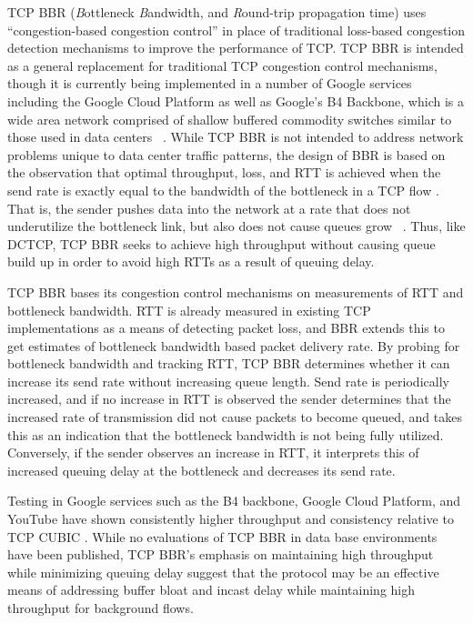 TCP BBR (\emph{B}ottleneck \emph{B}andwidth, and \emph{R}ound-trip propagation time) uses ``congestion-based congestion control'' in place of traditional loss-based congestion detection mechanisms to improve the performance of TCP. TCP BBR is intended as a general replacement for traditional TCP congestion control mechanisms, though it is currently being implemented in a number of Google services including the Google Cloud Platform as well as Google's B4 Backbone, which is a wide area network comprised of shallow buffered commodity switches similar to those used in data centers ~\cite{cardwell_bbr:_2016, cardwell_tcp_2017}. While TCP BBR is not intended to address network problems unique to data center traffic patterns, the design of BBR is based on the observation that optimal throughput, loss, and RTT is achieved when the send rate is exactly equal to the bandwidth of the bottleneck in a TCP flow \cite{kleinrock_power_1979}. That is, the sender pushes data into the network at a rate that does not underutilize the bottleneck link, but also does not cause queues grow ~\cite{cardwell_bbr:_2016}. Thus, like DCTCP, TCP BBR seeks to achieve high throughput without causing queue build up in order to avoid high RTTs as a result of queuing delay.

TCP BBR bases its congestion control mechanisms on measurements of RTT and bottleneck bandwidth. RTT is already measured in existing TCP implementations as a means of detecting packet loss, and BBR extends this to get estimates of bottleneck bandwidth based packet delivery rate. By probing for bottleneck bandwidth and tracking RTT, TCP BBR determines whether it can increase its send rate without increasing queue length. Send rate is periodically increased, and if no increase in RTT is observed the sender determines that the increased rate of transmission did not cause packets to become queued, and takes this as an indication that the bottleneck bandwidth is not being fully utilized. Conversely, if the sender observes an increase in RTT, it interprets this of increased queuing delay at the bottleneck and decreases its send rate. 

Testing in Google services such as the B4 backbone, Google Cloud Platform, and YouTube have shown consistently higher throughput and consistency relative to TCP CUBIC \cite{cardwell_bbr:_2016, cardwell_tcp_2017}. While no evaluations of TCP BBR in data base environments have been published, TCP BBR's emphasis on maintaining high throughput while minimizing queuing delay suggest that the protocol may be an effective means of addressing buffer bloat and incast delay while maintaining high throughput for background flows.

